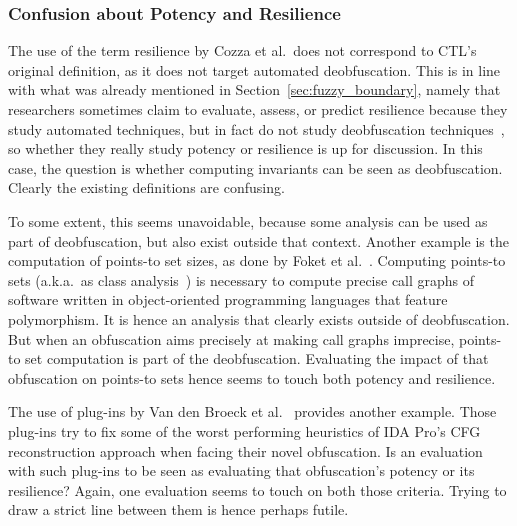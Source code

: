 \subsubsection{Confusion about Potency and Resilience}
The use of the term resilience by Cozza et al.\ does not correspond to CTL's original definition, as it does not target automated deobfuscation. This is in line with what was already mentioned in Section~\ref{sec:fuzzy_boundary}, namely that researchers sometimes claim to evaluate, assess, or predict resilience because they study automated techniques, but in fact do not study deobfuscation techniques~\cite{banescu15,2017_predicting_the_resilience_of_obfuscated_code_against_symbolic_execution_attacks_via_machine_learning}, so whether they really study potency or resilience is up for discussion. In this case, the question is whether computing invariants can be seen as deobfuscation. Clearly the existing definitions are confusing. 

To some extent, this seems unavoidable, because some analysis can be used as part of deobfuscation, but also exist outside that context. Another example is the computation of points-to set sizes, as done by Foket et al.~\cite{Foket14}. Computing points-to sets (a.k.a.\ as class analysis~\cite{vortex}) is necessary to compute precise call graphs of software written in object-oriented programming languages that feature polymorphism. 
It is hence an analysis that clearly exists outside of deobfuscation. But when an obfuscation aims precisely at making call graphs imprecise, points-to set computation is part of the deobfuscation. Evaluating the impact of that obfuscation on points-to sets hence seems to touch both potency and resilience.

The use of plug-ins by Van den Broeck et al.~\cite{jens21} provides another example. Those plug-ins try to fix some of the worst performing heuristics of IDA Pro's CFG reconstruction approach when facing their novel obfuscation. Is an evaluation with such plug-ins to be seen as evaluating that obfuscation's potency or its resilience? Again, one evaluation seems to touch on both those criteria. Trying to draw a strict line between them is hence perhaps futile. 